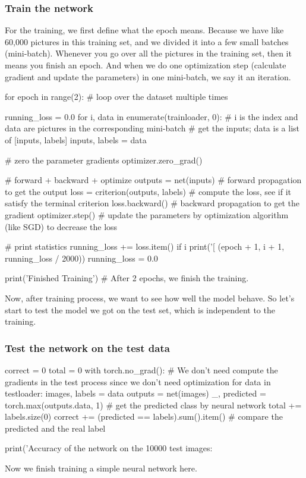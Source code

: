 \subsubsection{Train the network}
For the training, we first define what the epoch means. Because we have like 60,000 pictures in this training set, and we divided it into a few small batches (mini-batch). Whenever you go over all the pictures in the training set, then it means you finish an epoch.
And when we do one optimization step (calculate gradient and update the parameters) in one mini-batch, we say it an iteration.
\begin{python}
for epoch in range(2):  # loop over the dataset multiple times

    running_loss = 0.0 
    for i, data in enumerate(trainloader, 0): # i is the index and data are pictures in the corresponding mini-batch
        # get the inputs; data is a list of [inputs, labels]
        inputs, labels = data

        # zero the parameter gradients
        optimizer.zero_grad()

        # forward + backward + optimize
        outputs = net(inputs) # forward propagation to get the output
        loss = criterion(outputs, labels) # compute the loss, see if it satisfy the terminal criterion
        loss.backward() # backward propagation to get the gradient
        optimizer.step() # update the parameters by optimization algorithm (like SGD) to decrease the loss

        # print statistics
        running_loss += loss.item()
        if i %
            print('[%
                  (epoch + 1, i + 1, running_loss / 2000))
            running_loss = 0.0

print('Finished Training') # After 2 epochs, we finish the training.
\end{python}

Now, after training process, we want to see how well the model behave. So let's start to test the model we got on the test set, which is independent to the training.
\subsubsection{Test the network on the test data}
\begin{python}
correct = 0 
total = 0
with torch.no_grad(): # We don't need compute the gradients in the test process since we don't need optimization
    for data in testloader:
        images, labels = data
        outputs = net(images)
        _, predicted = torch.max(outputs.data, 1) # get the predicted class by neural network
        total += labels.size(0)
        correct += (predicted == labels).sum().item() # compare the predicted and the real label

print('Accuracy of the network on the 10000 test images: %
\end{python}
Now we finish training a simple neural network here.



